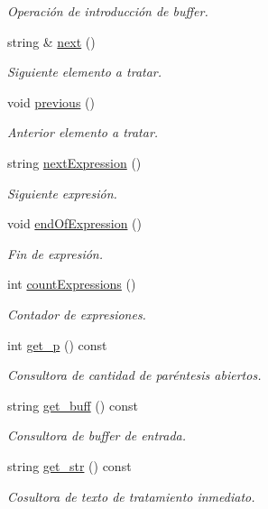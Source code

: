 \begin{DoxyCompactItemize}
\begin{DoxyCompactList}\small\item\em Operación de introducción de buffer. \end{DoxyCompactList}\item 
string \& \hyperlink{class_input_abe921301d0f6038e566b81780ca67a78}{next} ()
\begin{DoxyCompactList}\small\item\em Siguiente elemento a tratar. \end{DoxyCompactList}\item 
void \hyperlink{class_input_a8bf471815e7a4ef6f6083598bc1fe236}{previous} ()
\begin{DoxyCompactList}\small\item\em Anterior elemento a tratar. \end{DoxyCompactList}\item 
string \hyperlink{class_input_a1c8a389a2bccdcc8c6206c2fbdd6a9f8}{next\+Expression} ()
\begin{DoxyCompactList}\small\item\em Siguiente expresión. \end{DoxyCompactList}\item 
void \hyperlink{class_input_a326f5a9c81353747b9f525bb32dbc8df}{end\+Of\+Expression} ()
\begin{DoxyCompactList}\small\item\em Fin de expresión. \end{DoxyCompactList}\item 
int \hyperlink{class_input_ac9f1e2e25646ce602cf9ff83dcc563fe}{count\+Expressions} ()
\begin{DoxyCompactList}\small\item\em Contador de expresiones. \end{DoxyCompactList}\item 
int \hyperlink{class_input_a61a5b6e5b3e5d7b3022cf93ee5320a1e}{get\+\_\+p} () const 
\begin{DoxyCompactList}\small\item\em Consultora de cantidad de paréntesis abiertos. \end{DoxyCompactList}\item 
string \hyperlink{class_input_a0ac05102d9a18cffb38c149695a31b0c}{get\+\_\+buff} () const 
\begin{DoxyCompactList}\small\item\em Consultora de buffer de entrada. \end{DoxyCompactList}\item 
string \hyperlink{class_input_a1e3e0c2189a88504d8c5e440de162e77}{get\+\_\+str} () const 
\begin{DoxyCompactList}\small\item\em Cosultora de texto de tratamiento inmediato. \end{DoxyCompactList}\end{DoxyCompactItemize}

